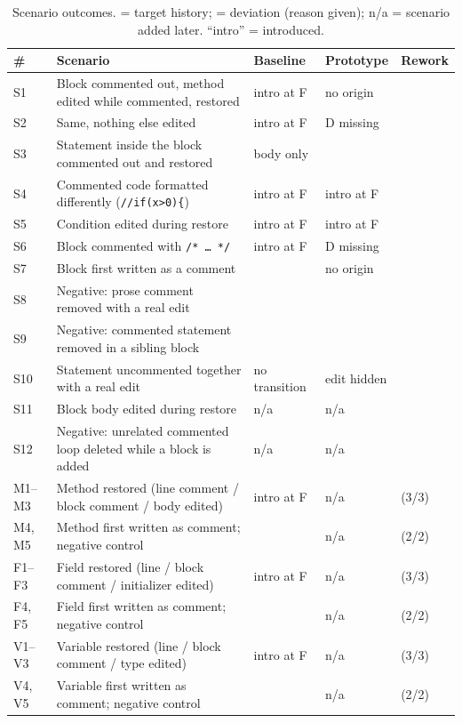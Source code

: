 \documentclass[11pt,a4paper]{article}
\newcommand{\ok}{\textcolor{okgreen}{\ding{51}}}
\newcommand{\no}{\textcolor{nored}{\ding{55}}}
\newcommand{\code}[1]{\texttt{#1}}
\begin{document}
\begin{table}[t]
\centering\small
\caption{Scenario outcomes. \ok{} = target history; \no{} = deviation (reason given); n/a = scenario added later. ``intro'' = introduced.}
\label{tab:scenarios}
\begin{tabularx}{\linewidth}{@{}lXlll@{}}
\toprule
\# & Scenario & Baseline & Prototype & Rework \\
\midrule
S1 & Block commented out, method edited while commented, restored & \no{} intro at F & \no{} no origin & \ok{} \\
S2 & Same, nothing else edited & \no{} intro at F & \no{} D missing & \ok{} \\
S3 & Statement inside the block commented out and restored & \no{} body only & \ok{} & \ok{} \\
S4 & Commented code formatted differently (\code{//if(x>0)\{}) & \no{} intro at F & \no{} intro at F & \ok{} \\
S5 & Condition edited during restore & \no{} intro at F & \no{} intro at F & \ok{} \\
S6 & Block commented with \code{/*\,\ldots\,*/} & \no{} intro at F & \no{} D missing & \ok{} \\
S7 & Block first written as a comment & \ok{} & \no{} no origin & \ok{} \\
S8 & Negative: prose comment removed with a real edit & \ok{} & \ok{} & \ok{} \\
S9 & Negative: commented statement removed in a sibling block & \ok{} & \ok{} & \ok{} \\
S10 & Statement uncommented together with a real edit & \no{} no transition & \no{} edit hidden & \ok{} \\
S11 & Block body edited during restore & n/a & n/a & \ok{} \\
S12 & Negative: unrelated commented loop deleted while a block is added & n/a & n/a & \ok{} \\
\midrule
M1--M3 & Method restored (line comment / block comment / body edited) & \no{} intro at F & n/a & \ok{} (3/3) \\
M4, M5 & Method first written as comment; negative control & \ok{} & n/a & \ok{} (2/2) \\
F1--F3 & Field restored (line / block comment / initializer edited) & \no{} intro at F & n/a & \ok{} (3/3) \\
F4, F5 & Field first written as comment; negative control & \ok{} & n/a & \ok{} (2/2) \\
V1--V3 & Variable restored (line / block comment / type edited) & \no{} intro at F & n/a & \ok{} (3/3) \\
V4, V5 & Variable first written as comment; negative control & \ok{} & n/a & \ok{} (2/2) \\
\bottomrule
\end{tabularx}
\end{table}
\end{document}
